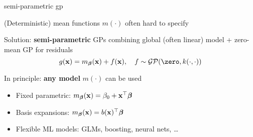 \documentclass[11pt,compress,t,notes=noshow, xcolor=table]{beamer}
\begin{document}
\begin{framei}[sep=L]{semi-parametric gp}
\item (Deterministic) mean functions $m(\cdot)$ often hard to specify
\item Solution: \textbf{semi-parametric} GPs combining global (often linear) model + zero-mean GP for residuals
$$g(\xv) = m_{\bm{\beta}}(\xv) + \fx, \quad f  \sim \GPzk$$

\item In principle: \textbf{any model} $m(\cdot)$ can be used
\begin{itemize}
  \item Fixed parametric: $m_{\bm{\beta}}(\mathbf{x})=\beta_0+\mathbf{x}^\top\bm{\beta}$
  \item Basis expansions: $m_{\bm{\beta}}(\mathbf{x})=b(\mathbf{x})^\top\bm{\beta}$
  \item Flexible ML models: GLMs, boosting, neural nets, \dots
\end{itemize}


\end{framei}


\end{document}
